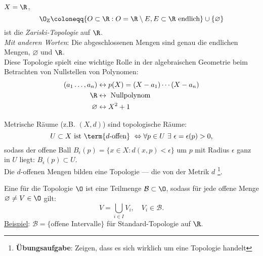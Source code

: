 \begin{example}\label{bsp:zariskitopologie}
  \( X = \R \),
  \begin{equation*}
    \O_\text{Z} \coloneqq \{ O \subset \R : O = \R \setminus E, E \subset \R \text{ endlich} \} \cup \{ \varnothing \}
  \end{equation*}
  ist die \emph{Zariski-Topologie} auf \( \R \). \\
  \emph{Mit anderen Worten}: Die abgeschlossenen Mengen sind genau die endlichen Mengen, \( \varnothing \) und \( \R \). \\
  Diese Topologie spielt eine wichtige Rolle in der algebraischen Geometrie beim Betrachten von Nullstellen von Polynomen: \\
  \begin{align*}
    (a_1 \dots, a_n) &\leftrightarrow p(X) = (X-a_1)\cdots(X-a_n) \\
     \R &\leftrightarrow \text{ Nullpolynom} \\
     \varnothing &\leftrightarrow X^2+1
  \end{align*}
\end{example}

\begin{definition}\label{def:induzierteTopologie}
  Metrische Räume (z.B. \( (X, d) \)) sind topologische Räume: \\
  \begin{equation*}
    U \subset X \text{ ist \term{\( d \)-offen} } \Leftrightarrow \forall p \in U \ \exists \ \epsilon = \epsilon(p) > 0\text{,}
  \end{equation*}
  sodass der offene Ball \( B_\epsilon(p) = \{ x \in X : d(x,p) < \epsilon \} \) um \( p \) mit Radius \( \epsilon \) ganz in \( U \) liegt: \( B_\epsilon(p) \subset U \). \\
  Die \( d \)-offenen Mengen bilden eine Topologie --- die von der Metrik \( d \) \footnote{\textbf{Übungsaufgabe}: Zeigen, dass es sich wirklich um eine Topologie handelt}.
\end{definition}

\begin{definition}[Basis]\label{def:basis}
  Eine  für die Topologie \( \O \) ist eine Teilmenge \( \mathcal{B} \subset \O \), sodass für jede offene Menge \( \varnothing \neq V \in \O \) gilt:
  \begin{equation*}
    V = \bigcup_{i \in I}V_i, \quad V_i \in \mathcal{B}\text{.}
  \end{equation*}
  \underline{Beispiel}: \( \mathcal{B} = \{ \text{offene Intervalle} \} \) für Standard-Topologie auf \( \R \).
\end{definition}

